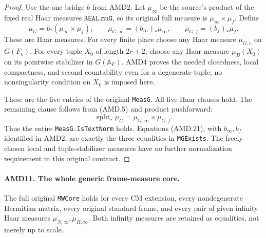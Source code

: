 \begin{proof}
Use the one bridge \(b\) from AMD2.  Let \(\mu_\infty\)
be the source's product of the fixed real Haar measures
\(\texttt{REAL.muG}\), so its original full measure is
\(\mu_\infty\times\mu_f\).  Define
\[
 \mu_G=b_*(\mu_\infty\times\mu_f),\qquad
 \mu_{G,\infty}=(b_\infty)_*\mu_\infty,\qquad
 \mu_{G,f}=(b_f)_*\mu_f.
 \tag{AMD.21}
\]
These are Haar measures.  For every finite place choose any
Haar measure \(\mu_{G,v}\) on \(G(F_v)\).  For every tuple
\(X_0\) of length \(2r+2\), choose any Haar measure \(\mu_B(X_0)\)
on its pointwise stabilizer in \(G(\mathbb A_F)\).
AMD4 proves the needed closedness, local compactness, and second
countability even for a degenerate tuple; no nonsingularity
condition on \(X_0\) is imposed here.

These are the five entries of the original \texttt{MeasG}.
All five Haar clauses hold.  The remaining clause follows
from (AMD.5) and product pushforward:
\[
        \operatorname{split}_*\mu_G
            =\mu_{G,\infty}\times\mu_{G,f}.
 \tag{AMD.22}
\]
Thus the entire \texttt{MeasG.IsTextNorm} holds.  Equations
(AMD.21), with \(b_\infty,b_f\) identified in AMD2, are
exactly the three equalities in \texttt{MGExists}.  The freely
chosen local and tuple-stabilizer measures have no further
normalization requirement in this original contract.
\end{proof}

\paragraph{AMD11. The whole generic frame-measure core.}
\label{claim:AMD11}
The full original \texttt{MWCore} holds for every CM extension,
every nondegenerate Hermitian matrix, every original standard
frame, and every pair of given infinity Haar measures
\(\mu_{N,\infty},\mu_{H,\infty}\).  Both infinity measures
are retained as equalities, not merely up to scale.

